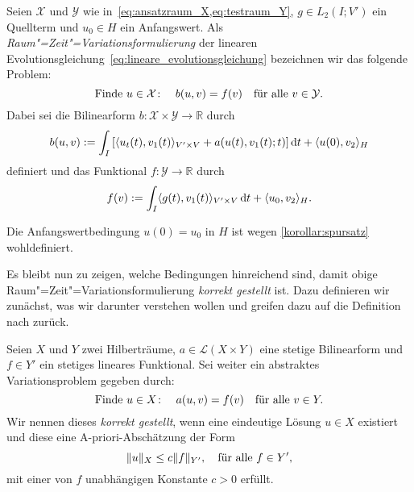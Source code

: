 \documentclass[../main.tex]{subfiles}
\begin{document}
\begin{Definition}
\label{definition:absktrakte_raum_zeit_formulierung}
    Seien $\mathcal X$ und $\mathcal Y$ wie in~\cref{eq:ansatzraum_X,eq:testraum_Y}, $g \in L_{2}(I; V')$ ein Quellterm und $u_{0} \in H$ ein Anfangswert.
    Als \emph{Raum"=Zeit"=Variationsformulierung} der linearen Evolutionsgleichung~\cref{eq:lineare_evolutionsgleichung} bezeichnen wir das folgende Problem:
    \begin{equation}
        \label{eq:absktrakte_raum_zeit_formulierung}
        \text{Finde } u \in \mathcal X \colon \quad b(u, v) = f(v) \quad \fa v \in \mathcal Y.
    \end{equation}
    Dabei sei die Bilinearform $b \colon \mathcal X \times \mathcal Y \to \mathbb{R}$ durch
    \begin{equation}
        \label{eq:absktrakte_raum_zeit_formulierung:lhs}
        b(u, v) := \int_{I} \left[   \skp{u_{t}(t)}{v_{1}(t)}{V' \times V} + a(u(t), v_{1}(t); t)  \right] \diff t + \skp{u(0)}{v_{2}}{H}
    \end{equation}
    definiert und das Funktional $f \colon \mathcal Y \to \mathbb{R}$ durch
    \begin{equation}
        \label{eq:absktrakte_raum_zeit_formulierung:rhs}
        f(v) := \int_{I} \skp{g(t)}{v_{1}(t)}{V' \times V} \diff t + \skp{u_{0}}{v_{2}}{H}.
    \end{equation}
\end{Definition}

\begin{Bemerkung}
    Die Anfangswertbedingung $u(0) = u_{0}$ in $H$ ist wegen \cref{korollar:spursatz} wohldefiniert.
\end{Bemerkung}

Es bleibt nun zu zeigen, welche Bedingungen hinreichend sind, damit obige Raum"=Zeit"=Variationsformulierung \emph{korrekt gestellt} ist.
Dazu definieren wir zunächst, was wir darunter verstehen wollen und greifen dazu auf die Definition nach \textcite{hadamard1902problemes} zurück.

\begin{Definition}[Hadamard]
\label{definition:sachgemaess_gestellt_nach_hadamard}
    Seien $X$ und $Y$ zwei Hilberträume, $a \in \mathcal L(X \times Y)$ eine stetige Bilinearform und $f \in Y'$ ein stetiges lineares Funktional.
    Sei weiter ein abstraktes Variationsproblem gegeben durch:
    \begin{equation}
    \label{eq:hadamard_variationsproblem}
        \text{Finde } u \in X \colon \quad a(u, v) = f(v) \quad \fa v \in Y.
    \end{equation}
    Wir nennen dieses \emph{korrekt gestellt}, wenn eine eindeutige Lösung $u \in X$ existiert und diese eine A-priori-Abschätzung der Form
    \begin{equation}
    \label{eq:hadamard_abschaetzung}
        \norm{u}_{X} \leq c \norm{f}_{Y'}, \quad \fa f \in Y',
    \end{equation}
    mit einer von $f$ unabhängigen Konstante $c > 0$ erfüllt.
\end{Definition}
\end{document}
